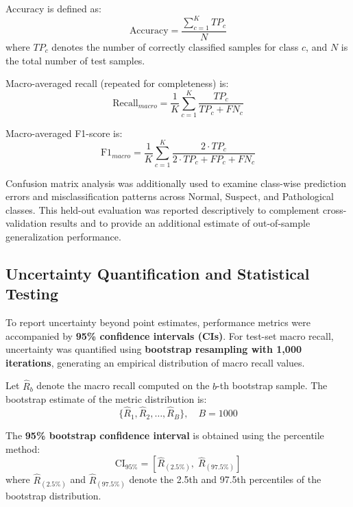 \documentclass[sigconf]{acmart}
\begin{document}
Accuracy is defined as:
\begin{equation}
\label{eq:accuracy}
\text{Accuracy} = \frac{\sum_{c=1}^{K} TP_c}{N}
\end{equation}
where $TP_c$ denotes the number of correctly classified samples for class $c$, and $N$ is the total number of test samples.

Macro-averaged recall (repeated for completeness) is:
\begin{equation}
\text{Recall}_{macro} = \frac{1}{K} \sum_{c=1}^{K} \frac{TP_c}{TP_c + FN_c}
\end{equation}

Macro-averaged F1-score is:
\begin{equation}
\text{F1}_{macro} = \frac{1}{K} \sum_{c=1}^{K}
\frac{2 \cdot TP_c}{2 \cdot TP_c + FP_c + FN_c}
\end{equation}

Confusion matrix analysis was additionally used to examine class-wise prediction errors and misclassification patterns across Normal, Suspect, and Pathological classes. This held-out evaluation was reported descriptively to complement cross-validation results and to provide an additional estimate of out-of-sample generalization performance.

\subsection{Uncertainty Quantification and Statistical Testing}
\label{subsec:uncertainty}

To report uncertainty beyond point estimates, performance metrics were accompanied by \textbf{95\% confidence intervals (CIs)}. For test-set macro recall, uncertainty was quantified using \textbf{bootstrap resampling with 1,000 iterations}, generating an empirical distribution of macro recall values.

Let $\hat{R}_b$ denote the macro recall computed on the $b$-th bootstrap sample. The bootstrap estimate of the metric distribution is:
\begin{equation}
\label{eq:bootstrap}
\{ \hat{R}_1, \hat{R}_2, \dots, \hat{R}_B \}, \quad B = 1000
\end{equation}

The \textbf{95\% bootstrap confidence interval} is obtained using the percentile method:
\begin{equation}
\label{eq:bootstrap_ci}
\text{CI}_{95\%} = \left[ \hat{R}_{(2.5\%)}, \; \hat{R}_{(97.5\%)} \right]
\end{equation}
where $\hat{R}_{(2.5\%)}$ and $\hat{R}_{(97.5\%)}$ denote the 2.5th and 97.5th percentiles of the bootstrap distribution.
\end{document}
